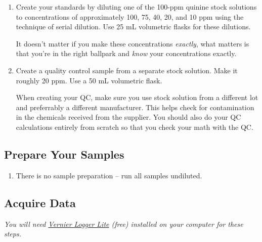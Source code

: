 \documentclass[]{tufte-book}
\providecommand{\tightlist}{%
  \setlength{\itemsep}{0pt}\setlength{\parskip}{0pt}}
\begin{document}
\begin{enumerate}
\def\labelenumi{\arabic{enumi}.}
\item
  Create your standards by diluting one of the 100-ppm quinine stock solutions to concentrations of approximately 100, 75, 40, 20, and 10 ppm using the technique of serial dilution. Use 25 mL volumetric flasks for these dilutions.

  \begin{marginfigure}
   It doesn't matter if you make these concentrations \emph{exactly}, what
   matters is that you're in the right ballpark and \emph{know} your
   concentrations exactly.
   \end{marginfigure}
\item
  Create a quality control sample from a separate stock solution. Make it roughly 20 ppm. Use a 50 mL volumetric flask.

  \begin{marginfigure}
   When creating your QC, make sure you use stock solution from a different
   lot and preferrably a different manufacturer. This helps check for
   contamination in the chemicals received from the supplier. You should
   also do your QC calculations entirely from scratch so that you check
   your math with the QC.
   \end{marginfigure}
\end{enumerate}

\hypertarget{prepare-your-samples}{%
\subsection{Prepare Your Samples}\label{prepare-your-samples}}

\begin{enumerate}
\def\labelenumi{\arabic{enumi}.}
\tightlist
\item
  There is no sample preparation -- run all samples undiluted.
\end{enumerate}

\hypertarget{acquire-data}{%
\subsection{Acquire Data}\label{acquire-data}}

\emph{You will need \href{https://www.vernier.com/products/software/logger-lite/\#section5}{Vernier Logger Lite} (free) installed on your computer for these steps.}
\end{document}
